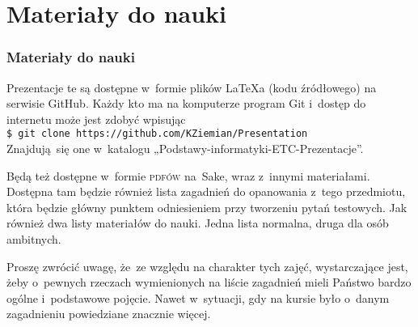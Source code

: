\documentclass[10pt,t]{beamer}
\begin{document}










\section{Materiały do nauki}



\begin{frame}
  \frametitle{Materiały do nauki}


  Prezentacje te są dostępne w~formie plików \LaTeX a (kodu źródłowego)
  na serwisie GitHub. Każdy kto ma na komputerze program Git i~dostęp
  do internetu może jest zdobyć wpisując \\
  \texttt{\$ git clone https://github.com/KZiemian/Presentation} \\
  Znajdują~się one w~katalogu „Podstawy-informatyki-ETC-Prezentacje”.

  Będą też dostępne w~formie \textsc{pdfów} na~Sake, wraz z~innymi
  materiałami. Dostępna tam będzie również lista zagadnień do opanowania
  z~tego przedmiotu, która będzie główny punktem odniesieniem przy
  tworzeniu pytań testowych. Jak również dwa listy materiałów do nauki.
  Jedna lista normalna, druga dla osób ambitnych.

  Proszę zwrócić uwagę, że~ze względu na charakter tych zajęć, wystarczające
  jest, żeby o~pewnych rzeczach wymienionych na liście zagadnień mieli
  Państwo bardzo ogólne i~podstawowe pojęcie. Nawet w~sytuacji, gdy na
  kursie było o~danym zagadnieniu powiedziane znacznie więcej.

\end{frame}
\end{document}
